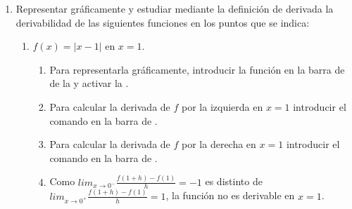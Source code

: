 \begin{enumerate}[leftmargin=*]
% 


\item Representar gráficamente y estudiar mediante la definición de derivada la derivabilidad de las siguientes funciones en los puntos que se indica:
      \begin{enumerate}
      \item $f(x)=|x-1|$ en $x=1$.

            \begin{indication}
            \begin{enumerate}
            \item Para representarla gráficamente, introducir la función  en la barra de  de la  y activar la .
            \item Para calcular la derivada de $f$ por la izquierda en $x=1$ introducir el comando  en la barra de .
            \item Para calcular la derivada de $f$ por la derecha en $x=1$ introducir el comando  en la barra de .
            \item Como $lim_{x\rightarrow 0^-}\frac{f(1+h)-f(1)}{h}=-1$ es distinto de $lim_{x\rightarrow 0^+}\frac{f(1+h)-f(1)}{h}=1$, la función no es derivable en $x=1$.
            \end{enumerate}
            \end{indication}


\end{enumerate}
\end{enumerate}
